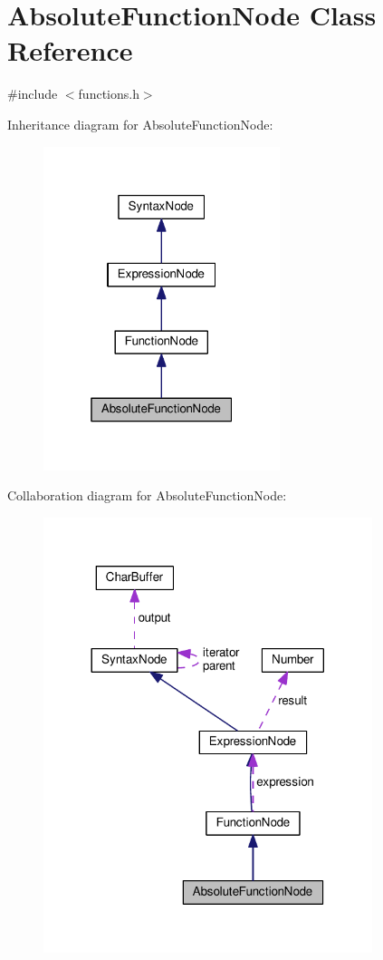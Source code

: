 \hypertarget{classAbsoluteFunctionNode}{}\section{Absolute\+Function\+Node Class Reference}
\label{classAbsoluteFunctionNode}


{\ttfamily \#include $<$functions.\+h$>$}



Inheritance diagram for Absolute\+Function\+Node\+:
\nopagebreak
\begin{figure}[H]
\begin{center}
\leavevmode
\includegraphics[width=196pt]{d8/d0a/classAbsoluteFunctionNode__inherit__graph}
\end{center}
\end{figure}


Collaboration diagram for Absolute\+Function\+Node\+:
\nopagebreak
\begin{figure}[H]
\begin{center}
\leavevmode
\includegraphics[width=272pt]{df/dc1/classAbsoluteFunctionNode__coll__graph}
\end{center}
\end{figure}
